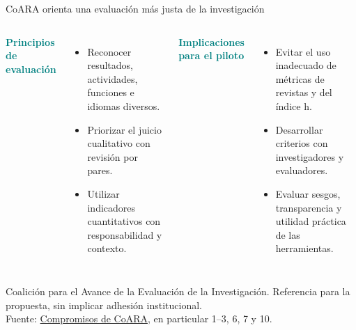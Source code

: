 \documentclass[aspectratio=169,11pt]{beamer}
\newcommand{\tagline}[1]{\textcolor{Teal}{\bfseries\small#1}}
\begin{document}
\begin{frame}{CoARA orienta una evaluación más justa de la investigación}
\begin{columns}[T,onlytextwidth]\tagline{Principios de evaluación}\par\vspace{.20cm}
\begin{itemize}\setlength\itemsep{.22cm}
\item Reconocer resultados, actividades, funciones e idiomas diversos.
\item Priorizar el juicio cualitativo con revisión por pares.
\item Utilizar indicadores cuantitativos con responsabilidad y contexto.
\end{itemize}
\tagline{Implicaciones para el piloto}\par\vspace{.20cm}
\begin{itemize}\setlength\itemsep{.22cm}
\item Evitar el uso inadecuado de métricas de revistas y del índice h.
\item Desarrollar criterios con investigadores y evaluadores.
\item Evaluar sesgos, transparencia y utilidad práctica de las herramientas.
\end{itemize}
\end{columns}
\vfill
\begin{center}\small {\footnotesize Coalición para el Avance de la Evaluación de la Investigación. Referencia para la propuesta, sin implicar adhesión institucional.}\\[.10cm]{\tiny Fuente: \href{https://www.coara.org/agreement/the-commitments/}{Compromisos de CoARA}, en particular 1--3, 6, 7 y 10.}\end{center}
\end{frame}
\end{document}
